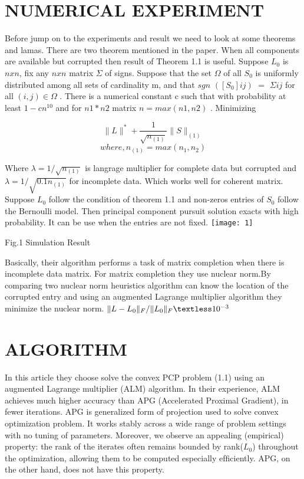 \documentclass[journal, a4paper]{IEEEtran}
\begin{document}
	



\section{NUMERICAL EXPERIMENT}
Before jump on to the experiments and result we need to look at some theorems and lamas. There are two theorem mentioned in the paper. When all components are available but corrupted then result of Theorem 1.1 is useful. Suppose $L_0$ is $n x n$, fix any $n x n$ matrix $\Sigma$ of signs. Suppose that the set $\Omega$ of all $S_0$ is uniformly distributed among all sets of cardinality m, and that $sgn$ $ ( [S_0]ij )$ $= $ $\Sigma ij $ for all  $(i,j) \in \Omega$ . There is a numerical constant c such that with probability at least $1-cn^{10}$ and for $n1 * n2$ matrix $n = max (n1, n2)$ . Minimizing

$$ \lVert L \rVert^*+\frac{1}{\sqrt{n_{(1)}}}  \lVert S \rVert_{(1)}   $$  $$where, n_{(1)}=max⁡(n_1,n_2 )$$


Where $\lambda = 1/\sqrt{n_{(1)}}$ is langrage multiplier for complete data but corrupted and $\lambda = 1/\sqrt{0.1n_{(1)}}$ for incomplete data. Which works well for coherent matrix.
Suppose $L_0$ follow the condition of theorem 1.1 and non-zeros entries of $S_0$ follow the Bernoulli model. Then principal component pursuit solution exacts with high probability. It can be use when the entries are not fixed.     
\texttt{[image: 1]}\begin{center}
	\small Fig.1 Simulation Result
\end{center}
Basically, their algorithm performs a task of matrix completion when there is incomplete data matrix. For matrix completion they use nuclear norm.By comparing two nuclear norm heuristics algorithm can know the location of the corrupted entry and using an augmented Lagrange multiplier algorithm they minimize the nuclear norm. $\lVert L-L_0 \rVert_F / \lVert L_0 \rVert_F \textless 10^{-3}$ 


\section{ALGORITHM}
In this article they choose solve the convex PCP problem (1.1) using an augmented Lagrange multiplier (ALM) algorithm. In their experience, ALM achieves much higher
accuracy than APG (Accelerated Proximal Gradient), in fewer iterations. APG is generalized form of projection used to solve convex optimization problem. It works stably across a wide range of problem settings with no tuning of parameters. Moreover, we observe an appealing (empirical) property: the rank of the iterates often remains bounded by rank($L_0$)
throughout the optimization, allowing them to be computed especially efﬁciently. APG, on the other hand, does not have this property.
\end{document}
